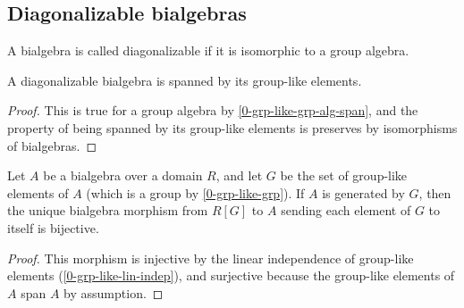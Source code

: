 \subsection{Diagonalizable bialgebras}


\begin{definition}
  \label{0-is-diag-bialg}
  \uses{}
  \leanok

  A bialgebra is called diagonalizable if it is isomorphic to a group algebra.
\end{definition}


\begin{lemma}
  \label{0-is-diag-bialg-group-like-span}
  \leanok

  A diagonalizable bialgebra is spanned by its group-like elements.
\end{lemma}
\begin{proof}
  \leanok

  This is true for a group algebra by \ref{0-grp-like-grp-alg-span}, and the
  property of being spanned by its group-like elements is preserves by
  isomorphisms of bialgebras.
\end{proof}


\begin{proposition}
  \label{0-bialg-bij-of-span-grp-like}
  \leanok

  Let $A$ be a bialgebra over a domain $R$, and let $G$ be the set of group-like
  elements of $A$ (which is a group by \ref{0-grp-like-grp}). If $A$ is generated
  by $G$, then the unique bialgebra morphism from $R[G]$ to $A$ sending each
  element of $G$ to itself is bijective.
\end{proposition}
\begin{proof}
  \leanok

  This morphism is injective by the linear independence of group-like elements
  (\ref{0-grp-like-lin-indep}), and surjective because the group-like elements
  of $A$ span $A$ by assumption.
\end{proof}



